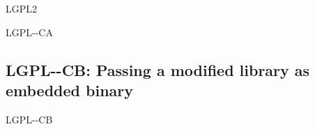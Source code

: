 \begin{license}{LGPL2}
\begin{lsuc}{LGPL-\ver-CA}
  \useCaseA

  \begin{lsucrequires}
    \lsucmandatory{\keepLicensingElements}
    \lsucmandatory{\lgpltwoEnsureCopyrightNoticeSource}
    \lsucmandatory{\giveLicense}\passingFilesCorrectly
    \lsucmandatory{\markEmbeddedModifications}
    \lsucmandatory{\arrangeEmbeddedChanges}\howToApplyTheseTerms
    \lsucmandatory{\keepStructuralIndependence}
    \lsucmandatory{\addToCopyrightDialogLibWeak}
    \lsucoptional{\createChangelog}  
    \lsucoptional{\addToDocumentation}
    \lsucoptional{\retainCopyrightNotices}
  \end{lsucrequires}

  \begin{lsucprohibits}
  \end{lsucprohibits}
\end{lsuc}

\subsection{LGPL-\ver-CB: Passing a modified library as embedded binary}
\begin{lsuc}{LGPL-\ver-CB}

  \useCaseB

  \begin{lsucrequires}
    \lsucmandatory{\keepLicensingElements}
    \lsucmandatory{\lgpltwoEnsureCopyrightNoticeBinary}
    \lsucmandatory{\giveLicense}\passingFilesCorrectly
    \lsucmandatory{\makeEmbeddedSourceAvailable}
    \lsucmandatory{\describeHowToGetSource}
    \lsucmandatory{\markEmbeddedModifications}
    \lsucmandatory{\arrangeEmbeddedChanges}\howToApplyTheseTerms
    \lsucmandatory{\keepStructuralIndependence}
    \lsucmandatory{\addToCopyrightDialogLibWeak}
    \lsucmandatory{\allowRelinking}
    \lsucoptional{\createChangelog}  
    \lsucoptional{\addToDocumentation}
    \lsucoptional{\retainCopyrightNotices}
  \end{lsucrequires}

  \begin{lsucprohibits}
  \end{lsucprohibits}
\end{lsuc}

\end{license}

